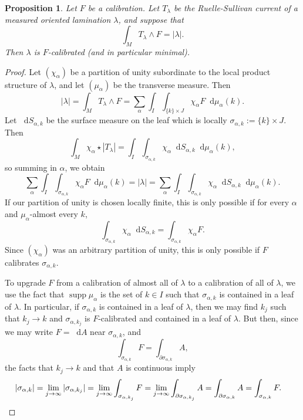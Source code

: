 \documentclass[reqno,11pt]{amsart}
\newcommand*\dif{\mathop{}\!\mathrm{d}}
\DeclareMathOperator{\supp}{supp}
\newtheorem{proposition}[theorem]{Proposition}
\theoremstyle{definition}
\numberwithin{equation}{section}
\begin{document}
\begin{proposition}\label{calibration condition}
Let $F$ be a calibration.
Let $T_\lambda$ be the Ruelle-Sullivan current of a measured oriented lamination $\lambda$, and suppose that 
\begin{equation}\label{calibration by Ruelle Sullivan}
\int_M T_\lambda \wedge F = |\lambda|.
\end{equation}
Then $\lambda$ is $F$-calibrated (and in particular minimal).
\end{proposition}
\begin{proof}
Let $(\chi_\alpha)$ be a partition of unity subordinate to the local product structure of $\lambda$, and let $(\mu_\alpha)$ be the transverse measure.
Then 
$$|\lambda| = \int_M T_\lambda \wedge F = \sum_\alpha \int_I \int_{\{k\} \times J} \chi_\alpha F \dif \mu_\alpha(k).$$
Let $\dif S_{\alpha,k}$ be the surface measure on the leaf which is locally $\sigma_{\alpha,k} := \{k\} \times J$. Then
$$\int_M \chi_\alpha \star |T_\lambda| = \int_I \int_{\sigma_{\alpha,k}} \chi_\alpha \dif S_{\alpha,k} \dif \mu_\alpha(k),$$
so summing in $\alpha$, we obtain 
$$\sum_\alpha \int_I \int_{\sigma_{\alpha,k}} \chi_\alpha F \dif \mu_\alpha(k) = |\lambda| = \sum_\alpha \int_I \int_{\sigma_{\alpha,k}} \chi_\alpha \dif S_{\alpha,k} \dif \mu_\alpha(k).$$
If our partition of unity is chosen locally finite, this is only possible if for every $\alpha$ and $\mu_\alpha$-almost every $k$, 
$$\int_{\sigma_{\alpha,k}} \chi_\alpha \dif S_{\alpha,k}  = \int_{\sigma_{\alpha,k}} \chi_\alpha F.$$
Since $(\chi_\alpha)$ was an arbitrary partition of unity, this is only possible if $F$ calibrates $\sigma_{\alpha, k}$.

To upgrade $F$ from a calibration of almost all of $\lambda$ to a calibration of all of $\lambda$, we use the fact that $\supp \mu_\alpha$ is the set of $k \in I$ such that $\sigma_{\alpha, k}$ is contained in a leaf of $\lambda$.
In particular, if $\sigma_{\alpha, k}$ is contained in a leaf of $\lambda$, then we may find $k_j$ such that $k_j \to k$ and $\sigma_{\alpha, k_j}$ is $F$-calibrated and contained in a leaf of $\lambda$.
But then, since we may write $F = \dif A$ near $\sigma_{\alpha, k}$, and 
$$\int_{\sigma_{\alpha, k}} F = \int_{\partial \sigma_{\alpha, k}} A,$$
the facts that $k_j \to k$ and that $A$ is continuous imply 
\begin{align*}
|\sigma_{\alpha, k}| &= \lim_{j \to \infty} |\sigma_{\alpha, k_j}| = \lim_{j \to \infty} \int_{\sigma_{\alpha, k_j}} F = \lim_{j \to \infty} \int_{\partial \sigma_{\alpha, k_j}} A = \int_{\partial \sigma_{\alpha, k}} A = \int_{\sigma_{\alpha, k}} F. \qedhere 
\end{align*}
\end{proof}
\end{document}

